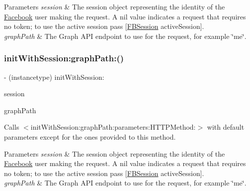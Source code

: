 \begin{DoxyParams}{Parameters}
{\em session} & The session object representing the identity of the \hyperlink{interfaceFacebook}{Facebook} user making the request. A nil value indicates a request that requires no token; to use the active session pass {\ttfamily \mbox{[}\hyperlink{interfaceFBSession}{F\+B\+Session} active\+Session\mbox{]}}.\\
\hline
{\em graph\+Path} & The Graph A\+PI endpoint to use for the request, for example \char`\"{}me\char`\"{}. \\
\hline
\end{DoxyParams}
\mbox{\label{interfaceFBRequest_abf08647708e28e2fe5422e90680bd9dc}} 
\subsubsection{\texorpdfstring{init\+With\+Session\+:graph\+Path\+:()}{initWithSession:graphPath:()}\hspace{0.1cm}{\footnotesize\ttfamily [2/5]}}
{\footnotesize\ttfamily -\/ (instancetype) init\+With\+Session\+: \begin{DoxyParamCaption}\item[{(\hyperlink{interfaceFBSession}{F\+B\+Session} $\ast$)}]{session }\item[{graphPath:(N\+S\+String $\ast$)}]{graph\+Path }\end{DoxyParamCaption}}

Calls $<$init\+With\+Session\+:graph\+Path\+:parameters\+:\+H\+T\+T\+P\+Method\+:$>$ with default parameters except for the ones provided to this method.


\begin{DoxyParams}{Parameters}
{\em session} & The session object representing the identity of the \hyperlink{interfaceFacebook}{Facebook} user making the request. A nil value indicates a request that requires no token; to use the active session pass {\ttfamily \mbox{[}\hyperlink{interfaceFBSession}{F\+B\+Session} active\+Session\mbox{]}}.\\
\hline
{\em graph\+Path} & The Graph A\+PI endpoint to use for the request, for example \char`\"{}me\char`\"{}. \\
\hline
\end{DoxyParams}
\mbox{\label{interfaceFBRequest_abf08647708e28e2fe5422e90680bd9dc}} 
